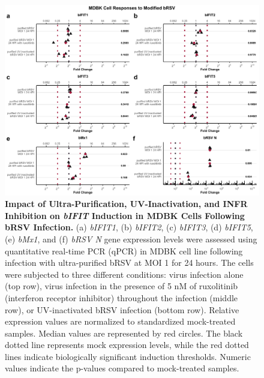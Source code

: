\begin{figure}
    \centering
    \includegraphics[width=1\linewidth]{07. Chapter 2/Figs/02. Induction/04. mdbk_brsv_uv_roxo.pdf}
    \caption[Impact of Ultra-Purification, UV-Inactivation, and INFR Inhibition on \textit{bIFIT} Induction in MDBK Cells Following bRSV Infection.]{\textbf{Impact of Ultra-Purification, UV-Inactivation, and INFR Inhibition on \textit{bIFIT} Induction in MDBK Cells Following bRSV Infection.} (a) \textit{bIFIT1}, (b) \textit{bIFIT2}, (c) \textit{bIFIT3}, (d) \textit{bIFIT5}, (e) \textit{bMx1}, and (f) \textit{bRSV N} gene expression levels were assessed using quantitative real-time PCR (qPCR) in MDBK cell line following infection with ultra-purified bRSV at MOI 1 for 24 hours. The cells were subjected to three different conditions: virus infection alone (top row), virus infection in the presence of 5 nM of ruxolitinib (interferon receptor inhibitor) throughout the infection (middle row), or UV-inactivated bRSV infection (bottom row). Relative expression values are normalized to standardized mock-treated samples. Median values are represented by red circles. The black dotted line represents mock expression levels, while the red dotted lines indicate biologically significant induction thresholds. Numeric values indicate the p-values compared to mock-treated samples.}
    \label{fig:The effect of ultra-purification, UV-inactivation and INFR inhibition on hIFIT induction following hRSV infection in MDBK}
\end{figure}


